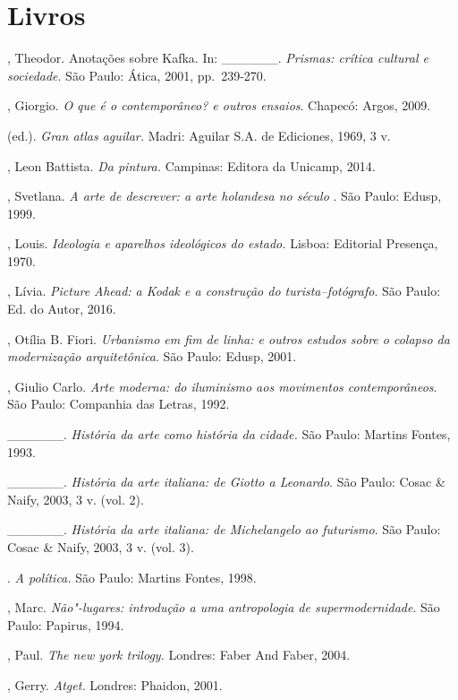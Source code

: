 \section{Livros}

\begin{Parskip}
, Theodor. Anotações sobre Kafka. In: \_\_\_\_\_\_.
\emph{Prismas: crítica cultural e sociedade}. São Paulo: Ática, 2001,
pp.~239-270.

, Giorgio. \emph{O que é o contemporâneo? e outros ensaios}.
Chapecó: Argos, 2009.

 (ed.). \emph{Gran atlas aguilar.} Madri: Aguilar S.A. de
Ediciones, 1969, 3 v.

, Leon Battista. \emph{Da pintura.} Campinas: Editora da
Unicamp, 2014.

, Svetlana. \emph{A arte de descrever: a arte holandesa no
século }. São Paulo: Edusp, 1999.

, Louis. \emph{Ideologia e aparelhos ideológicos do estado.}
Lisboa: Editorial Presença, 1970.

, Lívia. \emph{Picture Ahead: a Kodak e a construção do
turista--fotógrafo}. São Paulo: Ed. do Autor, 2016.

, Otília B. Fiori. \emph{Urbanismo em fim de linha: e outros
estudos sobre o colapso da modernização arquitetônica}. São Paulo: Edusp,
2001.

, Giulio Carlo. \emph{Arte moderna: do iluminismo aos movimentos
contemporâneos}. São Paulo: Companhia das Letras, 1992.

\_\_\_\_\_\_. \emph{História da arte como história da cidade.} São
Paulo: Martins Fontes, 1993.

\_\_\_\_\_\_. \emph{História da arte italiana: de Giotto a
Leonardo}. São Paulo: Cosac \& Naify, 2003, 3 v. (vol. 2).

\_\_\_\_\_\_. \emph{História da arte italiana: de Michelangelo ao
futurismo}. São Paulo: Cosac \& Naify, 2003, 3 v. (vol. 3).

. \emph{A política.} São Paulo: Martins Fontes, 1998.

, Marc. \emph{Não"-lugares: introdução a uma antropologia de
supermodernidade}. São Paulo: Papirus, 1994.

, Paul. \emph{The new york trilogy.} Londres: Faber And Faber,
2004.

, Gerry. \emph{Atget.} Londres: Phaidon, 2001.


\end{Parskip}
